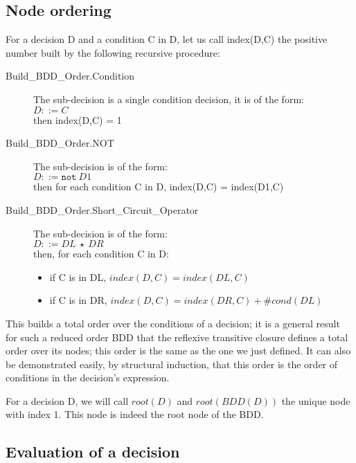 \documentclass[a4paper,12pt,twoside]{article}
\newcommand{\anysc}{\star}
\newcommand{\adanot}{\texttt{not}}
\begin{document}
\subsection{Node ordering}

For a decision D and a condition C in D, let us call index(D,C) the
positive number built by the following recursive procedure:

\begin{description}
\item[Build\_BDD\_Order.Condition]
  The sub-decision is a single condition decision, it is of the form:\\
  $D ::= C$\\
  then index(D,C) = 1\\

\item[Build\_BDD\_Order.NOT]
  The sub-decision is of the form:\\
  $D ::= \adanot{} \ D1$\\
  then for each condition C in D, index(D,C) = index(D1,C)\\

\item[Build\_BDD\_Order.Short\_Circuit\_Operator]
  The sub-decision is of the form:\\
  $D ::= DL \ \anysc{}\ DR$\\
  then, for each condition C in D:\\
  \begin{itemize}
    \item if C is in DL, $index(D,C) = index(DL,C)$
    \item if C is in DR, $index(D,C) = index(DR,C) + \#cond(DL)$
  \end{itemize}
\end{description}

This builds a total order over the conditions of a decision; it is a
general result for such a reduced order BDD that the reflexive transitive
closure defines a total order over its nodes; this order is the same
as the one we just defined. It can also be demonstrated easily, by
structural induction, that this order is the order of conditions in
the decision's expression.

For a decision D, we will call $root(D)$ and $root(BDD(D))$ the unique
node with index 1.  This node is indeed the root node of the BDD.

\subsection{Evaluation of a decision}
\end{document}
